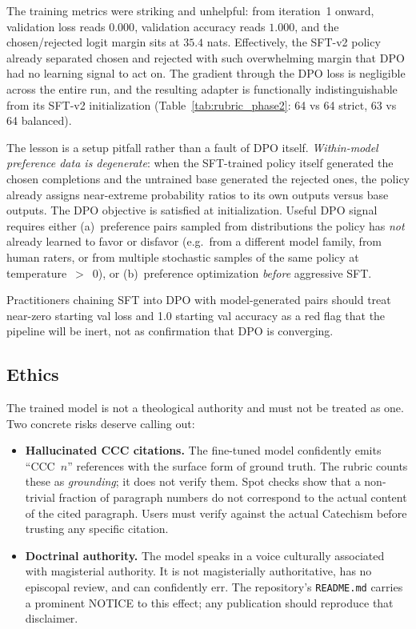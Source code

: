 The training metrics were striking and unhelpful: from iteration~1
onward, validation loss reads $0.000$, validation accuracy reads
$1.000$, and the chosen/rejected logit margin sits at $35.4$ nats.
Effectively, the SFT-v2 policy already separated chosen and rejected
with such overwhelming margin that DPO had no learning signal to act
on. The gradient through the DPO loss is negligible across the entire
run, and the resulting adapter is functionally indistinguishable from
its SFT-v2 initialization (Table~\ref{tab:rubric_phase2}: 64 vs 64
strict, 63 vs 64 balanced).

The lesson is a setup pitfall rather than a fault of DPO itself.
\emph{Within-model preference data is degenerate}: when the SFT-trained
policy itself generated the chosen completions and the untrained base
generated the rejected ones, the policy already assigns near-extreme
probability ratios to its own outputs versus base outputs. The DPO
objective is satisfied at initialization. Useful DPO signal requires
either (a)~preference pairs sampled from distributions the policy has
\emph{not} already learned to favor or disfavor (e.g.\ from a different
model family, from human raters, or from multiple stochastic samples
of the same policy at temperature~$>$~0), or (b)~preference
optimization \emph{before} aggressive SFT.

Practitioners chaining SFT into DPO with model-generated pairs should
treat near-zero starting val loss and 1.0 starting val accuracy as a
red flag that the pipeline will be inert, not as confirmation that
DPO is converging.

\subsection{Ethics}
\label{sec:ethics}

The trained model is not a theological authority and must not be
treated as one. Two concrete risks deserve calling out:

\begin{itemize}
  \item \textbf{Hallucinated CCC citations.} The fine-tuned model
        confidently emits ``CCC~$n$'' references with the surface form of
        ground truth. The rubric counts these as \emph{grounding}; it
        does not verify them. Spot checks show that a non-trivial fraction
        of paragraph numbers do not correspond to the actual content of
        the cited paragraph. Users must verify against the actual
        Catechism before trusting any specific citation.
  \item \textbf{Doctrinal authority.} The model speaks in a voice
        culturally associated with magisterial authority. It is not
        magisterially authoritative, has no episcopal review, and can
        confidently err. The repository's \texttt{README.md} carries a
        prominent NOTICE to this effect; any publication should
        reproduce that disclaimer.
\end{itemize}

